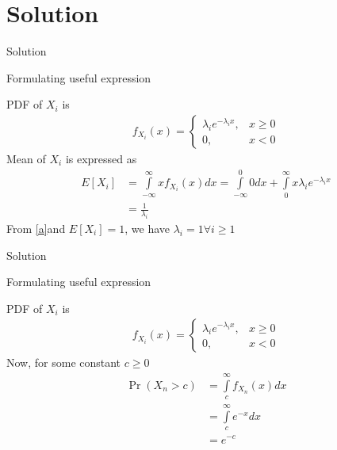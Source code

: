 \documentclass{beamer}
\providecommand{\pr}[1]{\ensuremath{\Pr\left(#1\right)}}
\newcommand{\Integral}[2]{\ensuremath{\int\limits_{#1}^{#2}}}
\providecommand{\pr}[1]{\ensuremath{\Pr\left(#1\right)}}
\theoremstyle{remark}
\providecommand{\mean}[1]{E[ #1 ]}
\numberwithin{equation}{subsection}
\begin{document}
\section{Solution}
\begin{frame}{Solution}
\begin{block}{Formulating useful expression}

PDF of $X_i$ is
\begin{align}
    f_{X_i}(x)=\begin{cases}\lambda_i e^{-\lambda_i x}, &x\geq 0\\
                0, &x<0\nonumber
    \end{cases}    
\end{align} 
Mean of $X_i$ is expressed as
\begin{align}
    \mean{X_i}&=\Integral{-\infty}{\infty}x f_{X_i}(x) dx
              =\Integral{-\infty}{0}0 dx + \Integral{0}{\infty}x \lambda_i e^{-\lambda_i x}\nonumber\\
              &=\frac{1}{\lambda_i}\label{a}
\end{align}
From \eqref{a}and $\mean{X_i}=1$, we have $\lambda_i=1 \forall  i \geq1$

\end{block}
\end{frame}

\begin{frame}{Solution}
\begin{block}{Formulating useful expression}

PDF of $X_i$ is
\begin{align}
    f_{X_i}(x)=\begin{cases}\lambda_i e^{-\lambda_i x}, &x\geq 0\\
                0, &x<0\nonumber
    \end{cases}    
\end{align} 
Now, for some constant $c\geq0$
\begin{align}
    \pr{X_n>c}&=\Integral{c}{\infty}f_{X_n}(x)dx\nonumber\\
              &=\Integral{c}{\infty}e^{-x}dx\nonumber\\
              &=e^{-c}\label{b}
\end{align}
\end{block}
\end{frame}
\end{document}
